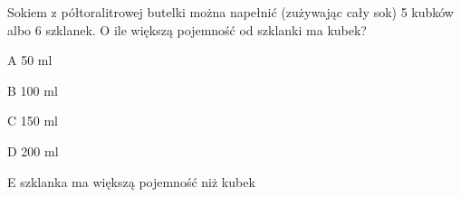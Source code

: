 \begin{tresc}
Sokiem z półtoralitrowej butelki można napełnić (zużywając cały sok) 5 kubków albo 6 szklanek. O ile większą pojemność od szklanki ma kubek?
\end{tresc}
\begin{wariant}{A} 50 ml \end{wariant}
\begin{wariant}{B} 100 ml \end{wariant}
\begin{wariant}{C} 150 ml \end{wariant}
\begin{wariant}{D} 200 ml \end{wariant}
\begin{wariant}{E} szklanka ma większą pojemność niż kubek \end{wariant}
